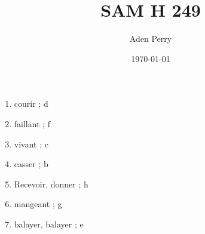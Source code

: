 \documentclass{article}
\title{SAM H 249}
\author{Aden Perry}
\date{\today}
\begin{document}
\maketitle

\begin{enumerate}
    \item courir ; d
    \item faillant ; f
    \item vivant ; c
    \item casser ; b
    \item Recevoir, donner ; h
    \item mangeant ; g
    \item balayer, balayer ; e
\end{enumerate}
\end{document}
